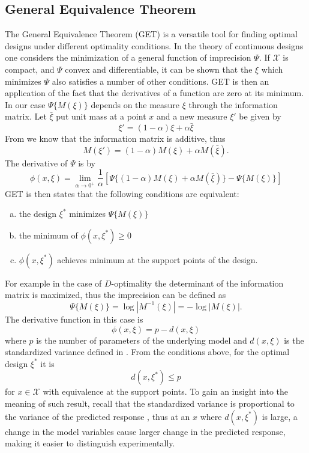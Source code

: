 \documentclass[12pt]{iopart}
\begin{document}
\subsection{General Equivalence Theorem}
\label{sec:get}
The General Equivalence Theorem (GET) is a versatile tool for finding optimal designs under different optimality conditions. In the theory of continuous designs one considers the minimization of a general function of imprecision $\Psi$. If $\mathcal{X}$ is compact, and $\Psi$ convex and differentiable, it can be shown that the $\xi$ which minimizes $\Psi$ also satisfies a number of other conditions. 
GET is then an application of the fact that the derivatives of a function are zero at its minimum. In our case $\Psi\{M(\xi)\}$ depends on the measure $\xi$ through the information matrix. Let $\bar \xi$ put unit mass at a point $x$ and a new measure $\xi'$ be given by
\begin{equation}
\xi' = (1-\alpha)\xi + \alpha \bar \xi
\end{equation}
From  we know that the information matrix is additive, thus
\begin{equation}
M(\xi') = (1-\alpha)M(\xi) + \alpha M(\bar \xi).
\end{equation}
The derivative of $\Psi$ is by
\begin{equation}
\phi(x, \xi) = \lim_{\alpha \rightarrow 0^+} \frac{1}{\alpha}\left[\Psi\{(1-\alpha)M(\xi) + \alpha M(\bar \xi)\} - \Psi\{M(\xi)\}\right]
\label{eq:deriv}
\end{equation}
GET is then states that the following conditions are equivalent:
\begin{enumerate}[(a)]
\item the design $\xi^*$ minimizes $\Psi\{M(\xi)\}$
\item the minimum of $\phi(x, \xi^*) \geq 0$
\item $\phi(x, \xi^*)$ achieves minimum at the support points of the design.
\end{enumerate}
For example in the case of $D$-optimality the determinant of the information matrix is maximized, thus the imprecision can be defined as
\begin{equation}
\Psi\{M(\xi)\} = \log|M^{-1}(\xi)| = - \log|M(\xi)|.
\end{equation}
The derivative function  in this case is
\begin{equation}
\phi(x, \xi) = p - d(x, \xi)
\label{eq:phicond}
\end{equation}
where $p$ is the number of parameters of the underlying model and $d(x, \xi)$ is the standardized variance defined in . From the conditions above, for the optimal design $\xi^*$ it is 
\begin{equation}
d(x, \xi^*) \leq p
\end{equation}
for $x \in \mathcal{X}$ with equivalence at the support points. To gain an insight into the meaning of such result, recall that the standardized variance is proportional to the variance of the predicted response , thus at an $x$ where $d(x,\xi^*)$ is large, a change in the model variables cause larger change in the predicted response, making it easier to distinguish experimentally.
\end{document}

